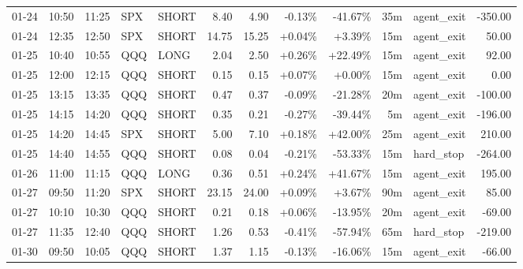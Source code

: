 \documentclass[11pt,a4paper]{article}
\begin{document}
\begin{center}
\begin{longtable}{>{\color{txtmain}}l l l l l r r r r r >{\color{txtmain}}l r}
01-24 & 10:50 & 11:25 & SPX & SHORT & 8.40 & 4.90 & \textcolor{lossred}{-0.13\%} & \textcolor{lossred}{-41.67\%} & 35m & agent\_exit & \textcolor{lossred}{-350.00} \\
01-24 & 12:35 & 12:50 & SPX & SHORT & 14.75 & 15.25 & \textcolor{wingreen}{+0.04\%} & \textcolor{wingreen}{+3.39\%} & 15m & agent\_exit & \textcolor{wingreen}{50.00} \\
01-25 & 10:40 & 10:55 & QQQ & LONG & 2.04 & 2.50 & \textcolor{wingreen}{+0.26\%} & \textcolor{wingreen}{+22.49\%} & 15m & agent\_exit & \textcolor{wingreen}{92.00} \\
01-25 & 12:00 & 12:15 & QQQ & SHORT & 0.15 & 0.15 & \textcolor{wingreen}{+0.07\%} & \textcolor{wingreen}{+0.00\%} & 15m & agent\_exit & \textcolor{wingreen}{0.00} \\
01-25 & 13:15 & 13:35 & QQQ & SHORT & 0.47 & 0.37 & \textcolor{lossred}{-0.09\%} & \textcolor{lossred}{-21.28\%} & 20m & agent\_exit & \textcolor{lossred}{-100.00} \\
01-25 & 14:15 & 14:20 & QQQ & SHORT & 0.35 & 0.21 & \textcolor{lossred}{-0.27\%} & \textcolor{lossred}{-39.44\%} & 5m & agent\_exit & \textcolor{lossred}{-196.00} \\
01-25 & 14:20 & 14:45 & SPX & SHORT & 5.00 & 7.10 & \textcolor{wingreen}{+0.18\%} & \textcolor{wingreen}{+42.00\%} & 25m & agent\_exit & \textcolor{wingreen}{210.00} \\
01-25 & 14:40 & 14:55 & QQQ & SHORT & 0.08 & 0.04 & \textcolor{lossred}{-0.21\%} & \textcolor{lossred}{-53.33\%} & 15m & hard\_stop & \textcolor{lossred}{-264.00} \\
01-26 & 11:00 & 11:15 & QQQ & LONG & 0.36 & 0.51 & \textcolor{wingreen}{+0.24\%} & \textcolor{wingreen}{+41.67\%} & 15m & agent\_exit & \textcolor{wingreen}{195.00} \\
01-27 & 09:50 & 11:20 & SPX & SHORT & 23.15 & 24.00 & \textcolor{wingreen}{+0.09\%} & \textcolor{wingreen}{+3.67\%} & 90m & agent\_exit & \textcolor{wingreen}{85.00} \\
01-27 & 10:10 & 10:30 & QQQ & SHORT & 0.21 & 0.18 & \textcolor{wingreen}{+0.06\%} & \textcolor{lossred}{-13.95\%} & 20m & agent\_exit & \textcolor{lossred}{-69.00} \\
01-27 & 11:35 & 12:40 & QQQ & SHORT & 1.26 & 0.53 & \textcolor{lossred}{-0.41\%} & \textcolor{lossred}{-57.94\%} & 65m & hard\_stop & \textcolor{lossred}{-219.00} \\
01-30 & 09:50 & 10:05 & QQQ & SHORT & 1.37 & 1.15 & \textcolor{lossred}{-0.13\%} & \textcolor{lossred}{-16.06\%} & 15m & agent\_exit & \textcolor{lossred}{-66.00} \\

\end{longtable}
\end{center}
\end{document}
